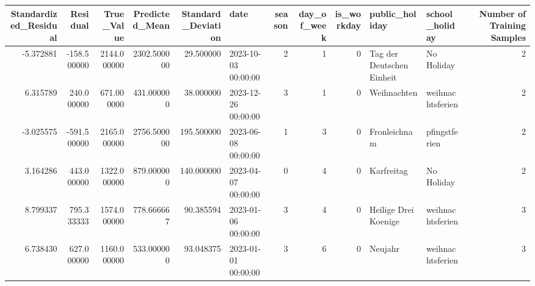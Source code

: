 \begin{tabular}{rrrrrlrrrllr}
\toprule
Standardized_Residual & Residual & True_Value & Predicted_Mean & Standard_Deviation & date & season & day_of_week & is_workday & public_holiday & school_holiday & Number of Training Samples \\
\midrule
-5.372881 & -158.500000 & 2144.000000 & 2302.500000 & 29.500000 & 2023-10-03 00:00:00 & 2 & 1 & 0 & Tag der Deutschen Einheit & No Holiday & 2 \\
6.315789 & 240.000000 & 671.000000 & 431.000000 & 38.000000 & 2023-12-26 00:00:00 & 3 & 1 & 0 & Weihnachten & weihnachtsferien & 2 \\
-3.025575 & -591.500000 & 2165.000000 & 2756.500000 & 195.500000 & 2023-06-08 00:00:00 & 1 & 3 & 0 & Fronleichnam & pfingstferien & 2 \\
3.164286 & 443.000000 & 1322.000000 & 879.000000 & 140.000000 & 2023-04-07 00:00:00 & 0 & 4 & 0 & Karfreitag & No Holiday & 2 \\
8.799337 & 795.333333 & 1574.000000 & 778.666667 & 90.385594 & 2023-01-06 00:00:00 & 3 & 4 & 0 & Heilige Drei Koenige & weihnachtsferien & 3 \\
6.738430 & 627.000000 & 1160.000000 & 533.000000 & 93.048375 & 2023-01-01 00:00:00 & 3 & 6 & 0 & Neujahr & weihnachtsferien & 3 \\
\bottomrule
\end{tabular}
